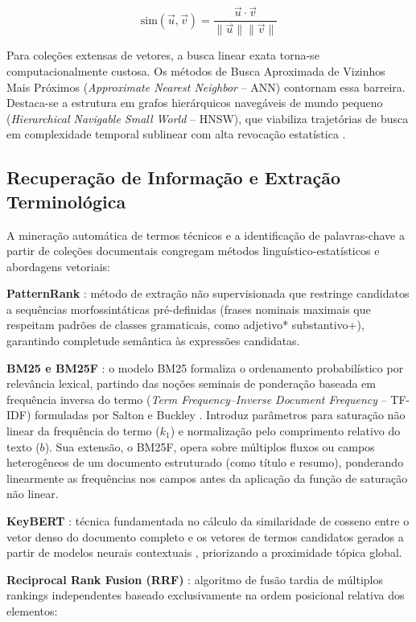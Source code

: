 \documentclass[12pt, a4paper]{article}
\begin{document}
$$\text{sim}(\vec{u}, \vec{v}) = \frac{\vec{u} \cdot \vec{v}}{\|\vec{u}\| \|\vec{v}\|}$$

  Para coleções extensas de vetores, a busca linear exata torna-se computacionalmente custosa. Os métodos de Busca Aproximada de Vizinhos Mais Próximos (\textit{Approximate Nearest Neighbor} -- ANN) contornam essa barreira. Destaca-se a estrutura em grafos hierárquicos navegáveis de mundo pequeno (\textit{Hierarchical Navigable Small World} -- HNSW), que viabiliza trajetórias de busca em complexidade temporal sublinear com alta revocação estatística \cite{gao2024}.

  \subsection{Recuperação de Informação e Extração Terminológica}
  \label{sec:extracao-teoria}

  A mineração automática de termos técnicos e a identificação de palavras-chave a partir de coleções documentais congregam métodos linguístico-estatísticos e abordagens vetoriais:

  \textbf{PatternRank} \cite{schopf2022}: método de extração não supervisionada que restringe candidatos a sequências morfossintáticas pré-definidas (frases nominais maximais que respeitam padrões de classes gramaticais, como adjetivo* substantivo+), garantindo completude semântica às expressões candidatas.

  \textbf{BM25 e BM25F} \cite{robertson2009, robertson2004}: o modelo BM25 formaliza o ordenamento probabilístico por relevância lexical, partindo das noções seminais de ponderação baseada em frequência inversa do termo (\textit{Term Frequency--Inverse Document Frequency} -- TF-IDF) formuladas por Salton e Buckley \cite{saltonbuckley1988}. Introduz parâmetros para saturação não linear da frequência do termo ($k_1$) e normalização pelo comprimento relativo do texto ($b$). Sua extensão, o BM25F, opera sobre múltiplos fluxos ou campos heterogêneos de um documento estruturado (como título e resumo), ponderando linearmente as frequências nos campos antes da aplicação da função de saturação não linear.

  \textbf{KeyBERT} \cite{grootendorst2020}: técnica fundamentada no cálculo da similaridade de cosseno entre o vetor denso do documento completo e os vetores de termos candidatos gerados a partir de modelos neurais contextuais \cite{reimers2019}, priorizando a proximidade tópica global.

  \textbf{Reciprocal Rank Fusion (RRF)} \cite{cormack2009}: algoritmo de fusão tardia de múltiplos rankings independentes baseado exclusivamente na ordem posicional relativa dos elementos:
\end{document}
